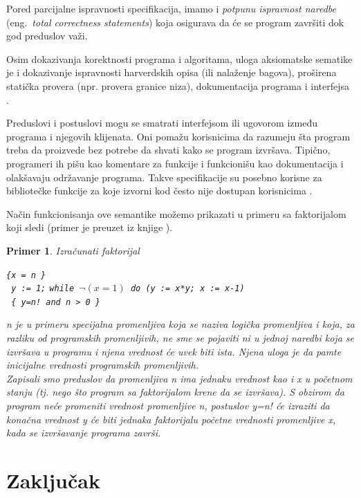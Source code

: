 \documentclass[a4paper]{article}
\newtheorem{primer}{Primer}[section]
\begin{document}
{Pored parcijalne ispravnosti specifikacija, imamo i \textit {potpunu ispravnost naredbe } (eng.~{\em  total correctness statements}) koja osigurava da će se program završiti dok god preduslov važi.

Osim dokazivanja korektnosti programa i algoritama, uloga aksiomatske sematike je i dokazivanje ispravnosti harverdskih opisa (ili nalaženje bagova), proširena statička provera (npr. provera granice niza), dokumentacija programa i interfejsa  \cite{bec} . 

Preduslovi i postuslovi mogu se smatrati interfejsom ili ugovorom između programa i njegovih klijenata. Oni pomažu korisnicima da razumeju šta program treba da proizvede bez potrebe da shvati kako se program izvršava. Tipično, programeri ih pišu kao komentare za funkcije i
funkcionišu kao dokumentacija i olakšavaju održavanje programa. Takve specifikacije su posebno
korisne za bibliotečke funkcije za koje izvorni kod često nije dostupan korisnicima \cite{adrian}.

Način funkcionisanja ove semantike možemo prikazati u primeru sa faktorijalom koji sledi (primer je preuzet iz knjige \cite{nielson} ). \\
\begin{primer} Izračunati faktorijal
\begin{center}


\texttt{\{x = n \}}   \\
\texttt{ y := 1;} 
 \texttt{while $ \neg(x=1) $   do  (y := x*y; x := x-1) }\\
\texttt{ \{ y=n! and  n > 0 \}  } \\
\end{center}
n je u primeru specijalna promenljiva koja se naziva logička promenljiva i koja, za razliku od programskih promenljivih, ne sme se pojaviti ni u jednoj naredbi koja se izvršava u programu i njena vrednost će uvek biti ista. Njena uloga je da pamte inicijalne vrednosti programskih promenljivih. \\
 Zapisali smo  preduslov da promenljiva n ima jednaku vrednost kao i x u početnom stanju (tj. nego što program sa faktorijalom krene da se izvršava). S obzirom da program neće promeniti vrednost promenljive n, postuslov y=n! će izraziti da konačna vrednost y  će biti jednaka faktorijalu početne vrednosti promenljive x, kada se izvršavanje programa završi. \\

\end{primer}

\section{Zaključak}
\label{sec:zakljucak}


}
\end{document}
